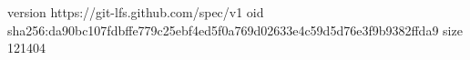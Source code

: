 version https://git-lfs.github.com/spec/v1
oid sha256:da90bc107fdbffe779c25ebf4ed5f0a769d02633e4c59d5d76e3f9b9382ffda9
size 121404
